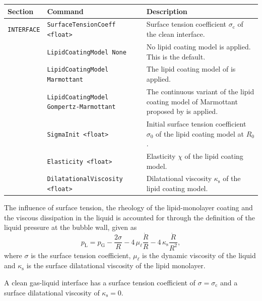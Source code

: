 \noindent
\begin{tabular}{p{} p{} p{}}
    \textbf{Section} &\textbf{Command} & \textbf{Description} 
\vspace{1mm} \\ \hline
{\tt INTERFACE} & {\tt SurfaceTensionCoeff <float> } & Surface tension coefficient $\sigma_\mathrm{c}$ of the clean interface.\\ 
& {\tt LipidCoatingModel None} & No lipid coating model is applied. This is the default.\\ 
& {\tt LipidCoatingModel Marmottant} & The lipid coating model of \citet{Marmottant2005} is applied.\\ 
& {\tt LipidCoatingModel Gompertz-Marmottant} & The continuous variant of the lipid coating model of Marmottant proposed by \citet{Guemmer2021} is applied.\\
& {\tt SigmaInit <float>} & Initial surface tension coefficient $\sigma_0$ of the lipid coating model at $R_0$.\\ 
& {\tt Elasticity <float>} & Elasticity $\chi$ of the lipid coating model.\\ 
& {\tt DilatationalViscosity <float>} & Dilatational viscosity $\kappa_\mathrm{s}$ of the lipid coating model.\\ 
 \hline
\end{tabular} \vspace{1em}

The influence of surface tension, the rheology of the lipid-monolayer coating and the viscous dissipation in the liquid is accounted for through the definition of the liquid pressure at the bubble wall, given as \citep{Marmottant2005}
\begin{equation}
p_\text{L} = p_\text{G} - \frac{2 \sigma}{R} - 4 \, \mu_\ell \frac{\dot{R}}{R} - 4 \, \kappa_\text{s} \frac{\dot{R}}{R^2} ,
\end{equation}
where $\sigma$ is the surface tension coefficient, $\mu_\ell$ is the dynamic viscosity of the liquid and $\kappa_\text{s}$ is the surface dilatational viscosity of the lipid monolayer.

A clean gas-liquid interface has a surface tension coefficient of $\sigma = \sigma_\text{c}$ and a surface dilatational viscosity of $\kappa_\text{s} = 0$. 

